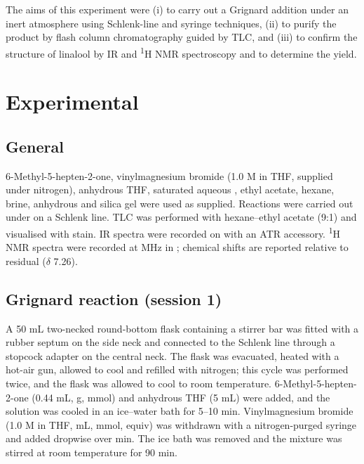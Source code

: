 \documentclass[11pt,a4paper]{article}
\begin{document}
The aims of this experiment were (i) to carry out a Grignard addition under an inert atmosphere using Schlenk-line and syringe techniques, (ii) to purify the product by flash column chromatography guided by TLC, and (iii) to confirm the structure of linalool by IR and \textsuperscript{1}H NMR spectroscopy and to determine the yield.

\section{Experimental}

\subsection{General}
6-Methyl-5-hepten-2-one, vinylmagnesium bromide (1.0 M in THF, supplied under nitrogen), anhydrous THF, saturated aqueous , ethyl acetate, hexane, brine, anhydrous  and silica gel were used as supplied. Reactions were carried out under  on a Schlenk line. TLC was performed with hexane--ethyl acetate (9:1) and visualised with  stain. IR spectra were recorded on  with an ATR accessory. \textsuperscript{1}H NMR spectra were recorded at  MHz in ; chemical shifts are reported relative to residual  ($\delta$ 7.26).\cite{Fulmer2010}

\subsection{Grignard reaction (session 1)}
A 50 mL two-necked round-bottom flask containing a stirrer bar was fitted with a rubber septum on the side neck and connected to the Schlenk line through a stopcock adapter on the central neck. The flask was evacuated, heated with a hot-air gun, allowed to cool and refilled with nitrogen; this cycle was performed twice, and the flask was allowed to cool to room temperature. 6-Methyl-5-hepten-2-one (0.44 mL,  g,  mmol) and anhydrous THF (5 mL) were added, and the solution was cooled in an ice--water bath for 5--10 min. Vinylmagnesium bromide (1.0 M in THF,  mL,  mmol,  equiv) was withdrawn with a nitrogen-purged syringe and added dropwise over  min.  The ice bath was removed and the mixture was stirred at room temperature for 90 min.
\end{document}
